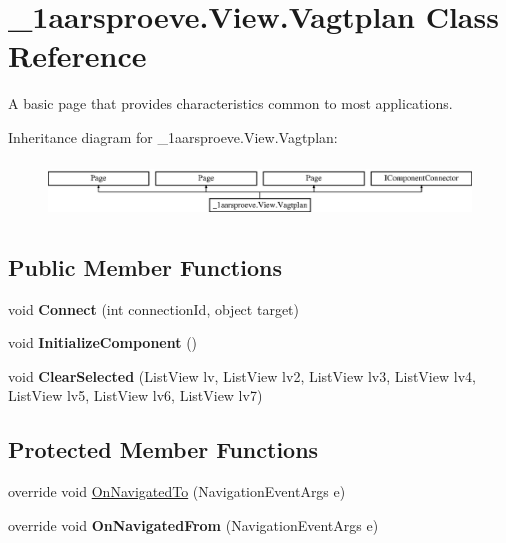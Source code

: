 \hypertarget{class__1aarsproeve_1_1_view_1_1_vagtplan}{}\section{\+\_\+1aarsproeve.\+View.\+Vagtplan Class Reference}
\label{class__1aarsproeve_1_1_view_1_1_vagtplan}


A basic page that provides characteristics common to most applications.  


Inheritance diagram for \+\_\+1aarsproeve.\+View.\+Vagtplan\+:\begin{figure}[H]
\begin{center}
\leavevmode
\includegraphics[height=1.513514cm]{class__1aarsproeve_1_1_view_1_1_vagtplan}
\end{center}
\end{figure}
\subsection*{Public Member Functions}
\begin{DoxyCompactItemize}
\item 
\hypertarget{class__1aarsproeve_1_1_view_1_1_vagtplan_ab5463d2d22c5daef5e72b0db649f28d2}{}void {\bfseries Connect} (int connection\+Id, object target)\label{class__1aarsproeve_1_1_view_1_1_vagtplan_ab5463d2d22c5daef5e72b0db649f28d2}

\item 
\hypertarget{class__1aarsproeve_1_1_view_1_1_vagtplan_a8a8cf75ef052a6e0a568fd355a812f16}{}void {\bfseries Initialize\+Component} ()\label{class__1aarsproeve_1_1_view_1_1_vagtplan_a8a8cf75ef052a6e0a568fd355a812f16}

\item 
\hypertarget{class__1aarsproeve_1_1_view_1_1_vagtplan_a248d88c64418617d7aa548864454eb17}{}void {\bfseries Clear\+Selected} (List\+View lv, List\+View lv2, List\+View lv3, List\+View lv4, List\+View lv5, List\+View lv6, List\+View lv7)\label{class__1aarsproeve_1_1_view_1_1_vagtplan_a248d88c64418617d7aa548864454eb17}

\end{DoxyCompactItemize}
\subsection*{Protected Member Functions}
\begin{DoxyCompactItemize}
\item 
override void \hyperlink{class__1aarsproeve_1_1_view_1_1_vagtplan_a527b20b4c4b466d22919195324fe2600}{On\+Navigated\+To} (Navigation\+Event\+Args e)
\item 
\hypertarget{class__1aarsproeve_1_1_view_1_1_vagtplan_a0bc36f20e2eec79bd26ca4701a42bcec}{}override void {\bfseries On\+Navigated\+From} (Navigation\+Event\+Args e)\label{class__1aarsproeve_1_1_view_1_1_vagtplan_a0bc36f20e2eec79bd26ca4701a42bcec}

\end{DoxyCompactItemize}
